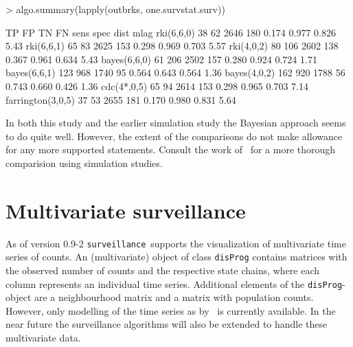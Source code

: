 \documentclass[a4paper,11pt]{article}
\newcommand{\surveillance}{\texttt{surveillance}}
\begin{document}
\begin{Schunk}
\end{Schunk}
\begin{Schunk}
\begin{Sinput}
> algo.summary(lapply(outbrks, one.survstat.surv))
\end{Sinput}
\end{Schunk}
\begin{Schunk}
\begin{Soutput}
                   TP  FP   TN  FN  sens  spec  dist mlag
rki(6,6,0)         38  62 2646 180 0.174 0.977 0.826 5.43
rki(6,6,1)         65  83 2625 153 0.298 0.969 0.703 5.57
rki(4,0,2)         80 106 2602 138 0.367 0.961 0.634 5.43
bayes(6,6,0)       61 206 2502 157 0.280 0.924 0.724 1.71
bayes(6,6,1)      123 968 1740  95 0.564 0.643 0.564 1.36
bayes(4,0,2)      162 920 1788  56 0.743 0.660 0.426 1.36
cdc(4*,0,5)        65  94 2614 153 0.298 0.965 0.703 7.14
farrington(3,0,5)  37  53 2655 181 0.170 0.980 0.831 5.64
\end{Soutput}
\end{Schunk}

In both this study and the earlier simulation study the Bayesian
approach seems to do quite well. However, the extent of the
comparisons do not make allowance for any more supported statements.
Consult the work of~\citet{riebler2004} for a more thorough
comparision using simulation studies.

\section{Multivariate surveillance}

As of version 0.9-2 \surveillance\ supports the visualization of
multivariate time series of counts. An (multivariate) object of class
\texttt{disProg} contains matrices with the observed number of counts
and the respective state chains, where each column represents an
individual time series.  Additional elements of the
\texttt{disProg}-object are a neighbourhood matrix and a matrix with
population counts. However, only modelling of the time series as
by~\citet{held2005} is currently available. In the near future the
surveillance algorithms will also be extended to handle these
multivariate data.
\end{document}
